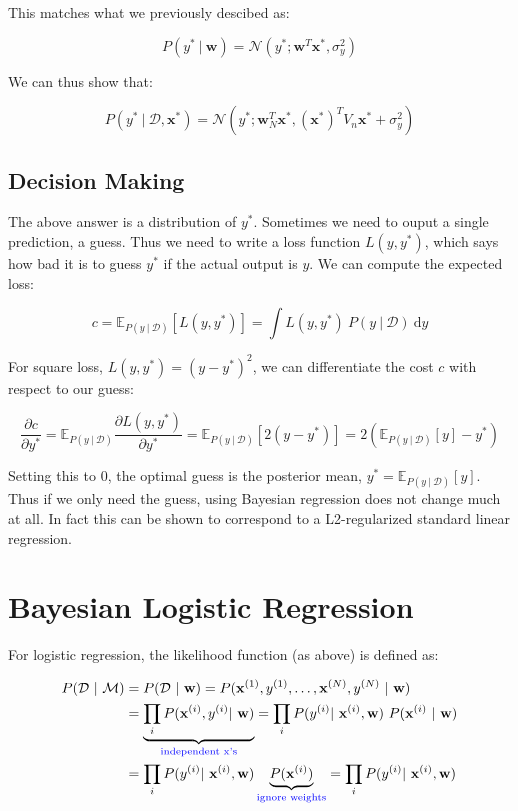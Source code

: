 \documentclass{article}
\newcommand{\vf}[1]{\mathbf{#1}}
\newcommand{\bx}{\vf{x}}
\newcommand{\bw}{\vf{w}}
\newcommand{\giv}{\ |\ }
\newcommand{\data}{\mathcal{D}}
\newcommand{\model}{\mathcal{M}}
\newcommand{\de}{\text{d}}
\newcommand{\blue}[1]{\textcolor{blue}{#1}}
\begin{document}
This matches what we previously descibed as:

\begin{equation*}
    P(y^* \giv \bw) = \mathcal{N}(y^*; \bw^T \bx^*, \sigma_y^2)
\end{equation*}

We can thus show that:

\begin{equation*}
    P(y^* \giv \mathcal{D}, \bx^*) =
        \mathcal{N}(y^*; \bw_N^T \bx^*, (\bx^*)^T V_n \bx^* + \sigma_y^2)
\end{equation*}

\subsection{Decision Making}
The above answer is a distribution of $y^*$. Sometimes we need to ouput a single prediction, a guess. Thus we need to write a loss function $L(y, y^*)$, which says how bad it is to guess $y^*$ if the actual output is $y$. We can compute the expected loss:

\begin{equation*}
    c = \mathbb{E}_{P(y \giv \mathcal{D})}[L(y, y^*)] =
        \int L(y, y^*)\ P(y \giv \mathcal{D})\ \de y
\end{equation*}

For square loss, $L(y, y^*) = (y - y^*)^2$, we can differentiate the cost $c$ with respect to our guess:

\begin{equation*}
    \frac{\partial c}{\partial y^*} =
        \mathbb{E}_{P(y \giv \mathcal{D})} \frac{\partial L(y, y^*)}{\partial y^*} =
        \mathbb{E}_{P(y \giv \mathcal{D})} [2(y - y^*)] =
        2 (\mathbb{E}_{P(y \giv \mathcal{D})} [y] - y^*)
\end{equation*}

Setting this to $0$, the optimal guess is the posterior mean, $y^* = \mathbb{E}_{P(y \giv \mathcal{D})}[y]$. Thus if we only need the guess, using Bayesian regression does not change much at all. In fact this can be shown to correspond to a L2-regularized standard linear regression.

\section{Bayesian Logistic Regression}
For logistic regression, the likelihood function (as above) is defined as:

\begin{align*}
    P(\mathcal{D} \giv \model) &=  P(\data \giv \bw) =
        P(\vf{x}^{(1)}, y^{(1)}, \dots, \vf{x}^{(N)}, y^{(N)}\ |\ \vf{w}) \\
    &= \underbrace{\prod_i P(\vf{x}^{(i)}, y^{(i)} |\ \vf{w})}_{\text{\blue{independent x's}}} = \prod_i P(y^{(i)} |\ \vf{x}^{(i)}, \vf{w})\ P(\vf{x}^{(i)}\ |\ \vf{w}) \\
    &= \prod_i P(y^{(i)} |\ \vf{x}^{(i)}, \vf{w}) \underbrace{P(\vf{x}^{(i)})}_{\text{\blue{ignore weights}}} = \prod_i P(y^{(i)} |\ \vf{x}^{(i)}, \vf{w})
\end{align*}
\end{document}
